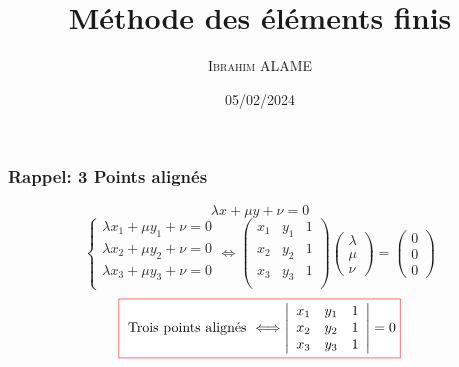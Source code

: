 \documentclass{beamer}
\title{Méthode des éléments finis}
\author{ \textsc{Ibrahim ALAME}}\institute{ESTP}
\date{05/02/2024}
\newcommand{\myredbox}[1]{\fcolorbox{red}{white}{$\displaystyle#1$}}
\begin{document}
 \begin{frame}
  \titlepage
  \end{frame}
  
\begin{frame}
\frametitle{Rappel: 3 Points alignés}

\begin{center}
\end{center}
\[\lambda x + \mu y +\nu =0\]
\[\left\{\begin{array}{l}
\lambda x_1 + \mu y_1 +\nu =0\\
\lambda x_2 + \mu y_2 +\nu =0\\
\lambda x_3 + \mu y_3 +\nu =0\\
\end{array}\right. \Longleftrightarrow \left(\begin{array}{ccc}
 x_1 & y_1 & 1 \\
 x_2 & y_2 & 1 \\
x_3 & y_3 &1\\
\end{array}\right)  \left(\begin{array}{c} \lambda \\ \mu \\ \nu \end{array}\right)  = \left(\begin{array}{c} 0 \\ 0 \\ 0\end{array}\right) 
\]
\[\myredbox{\mbox{ Trois points alignés } \Longleftrightarrow \left|\begin{array}{ccc}
 x_1 & y_1 & 1 \\
 x_2 & y_2 & 1 \\
x_3 & y_3 &1\\
\end{array}\right| =0}\]
\end{frame}
\end{document}
